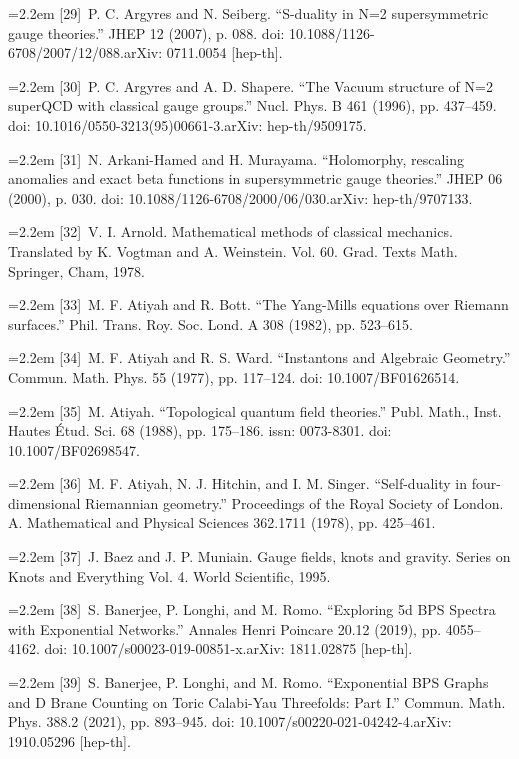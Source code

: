 \noindent\hangindent=2.2em [29]\ P. C. Argyres and N. Seiberg. “S-duality in N=2 supersymmetric gauge theories.” JHEP 12 (2007), p. 088. doi: 10.1088/1126-6708/2007/12/088.arXiv: 0711.0054 [hep-th].\par
\noindent\hangindent=2.2em [30]\ P. C. Argyres and A. D. Shapere. “The Vacuum structure of N=2 superQCD with classical gauge groups.” Nucl. Phys. B 461 (1996), pp. 437--459. doi: 10.1016/0550-3213(95)00661-3.arXiv: hep-th/9509175.\par
\noindent\hangindent=2.2em [31]\ N. Arkani-Hamed and H. Murayama. “Holomorphy, rescaling anomalies and exact beta functions in supersymmetric gauge theories.” JHEP 06 (2000), p. 030. doi: 10.1088/1126-6708/2000/06/030.arXiv: hep-th/9707133.\par
\noindent\hangindent=2.2em [32]\ V. I. Arnold. Mathematical methods of classical mechanics. Translated by K. Vogtman and A. Weinstein. Vol. 60. Grad. Texts Math. Springer, Cham, 1978.\par
\noindent\hangindent=2.2em [33]\ M. F. Atiyah and R. Bott. “The Yang-Mills equations over Riemann surfaces.” Phil. Trans. Roy. Soc. Lond. A 308 (1982), pp. 523--615.\par
\noindent\hangindent=2.2em [34]\ M. F. Atiyah and R. S. Ward. “Instantons and Algebraic Geometry.” Commun. Math. Phys. 55 (1977), pp. 117--124. doi: 10.1007/BF01626514.\par
\noindent\hangindent=2.2em [35]\ M. Atiyah. “Topological quantum field theories.” Publ. Math., Inst. Hautes Étud. Sci. 68 (1988), pp. 175--186. issn: 0073-8301. doi: 10.1007/BF02698547.\par
\noindent\hangindent=2.2em [36]\ M. F. Atiyah, N. J. Hitchin, and I. M. Singer. “Self-duality in four-dimensional Riemannian geometry.” Proceedings of the Royal Society of London. A. Mathematical and Physical Sciences 362.1711 (1978), pp. 425--461.\par
\noindent\hangindent=2.2em [37]\ J. Baez and J. P. Muniain. Gauge fields, knots and gravity. Series on Knots and Everything Vol. 4. World Scientific, 1995.\par
\noindent\hangindent=2.2em [38]\ S. Banerjee, P. Longhi, and M. Romo. “Exploring 5d BPS Spectra with Exponential Networks.” Annales Henri Poincare 20.12 (2019), pp. 4055--4162. doi: 10.1007/s00023-019-00851-x.arXiv: 1811.02875 [hep-th].\par
\noindent\hangindent=2.2em [39]\ S. Banerjee, P. Longhi, and M. Romo. “Exponential BPS Graphs and D Brane Counting on Toric Calabi-Yau Threefolds: Part I.” Commun. Math. Phys. 388.2 (2021), pp. 893--945. doi: 10.1007/s00220-021-04242-4.arXiv: 1910.05296 [hep-th].\par
